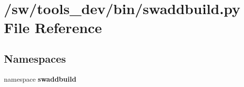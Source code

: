 \section{/sw/tools\_\-dev/bin/swaddbuild.py File Reference}
\label{swaddbuild_8py}
\subsection*{Namespaces}
\begin{CompactItemize}
\item 
namespace {\bf swaddbuild}
\end{CompactItemize}
